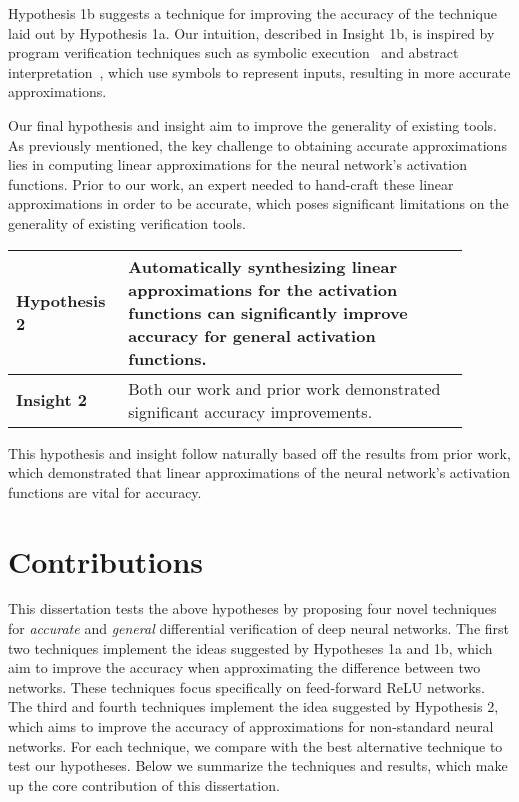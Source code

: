 Hypothesis 1b suggests a technique for improving the accuracy of the technique
laid out by Hypothesis 1a. Our intuition, described in Insight 1b, is inspired by
program verification techniques such as symbolic
execution~\cite{king1976symbolic} and abstract interpretation~\cite{CousotC77},
which use symbols to represent inputs, resulting in more accurate approximations.

Our final hypothesis and insight aim to improve the generality of existing tools.
As previously mentioned, the key challenge to obtaining accurate approximations
lies in computing linear approximations for the neural network's activation
functions. Prior to our work, an expert needed to hand-craft these linear
approximations in order to be accurate, which poses significant limitations on
the generality of existing verification tools.

\begin{table}[h]
	\centering
	\large
	\begin{tabular}{|p{0.2\linewidth}|p{0.7\linewidth}|} \hline
		\textbf{Hypothesis 2}      &
		Automatically synthesizing linear approximations for the activation
		functions can significantly improve accuracy for general activation
		functions. \\ \hline
		\textbf{Insight 2}        &
		Both our work and prior work demonstrated significant accuracy
		improvements. \\ \hline
	\end{tabular}
\end{table}

This hypothesis and insight follow naturally based off the results from prior
work, which demonstrated that linear approximations of the neural network's
activation functions are vital for accuracy.

\section{Contributions}
This dissertation tests the above hypotheses by proposing four novel techniques
for \textit{accurate} and \textit{general} differential verification of deep
neural networks. The first two techniques implement the ideas suggested by
Hypotheses 1a and 1b, which aim to improve the accuracy when approximating the
difference between two networks. These techniques focus specifically on
feed-forward ReLU networks. The third and fourth techniques implement the idea
suggested by Hypothesis 2, which aims to improve the accuracy of approximations
for non-standard neural networks. For each technique, we compare with the best
alternative technique to test our hypotheses. Below we summarize the techniques
and results, which make up the core contribution of this dissertation.


